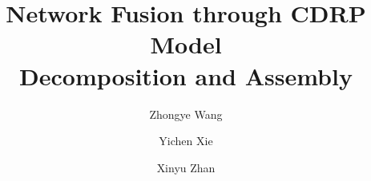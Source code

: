 \documentclass[sigplan,10pt,review]{acmart}\settopmatter{printfolios=true,printccs=false,printacmref=false}
\begin{document}
\title[Network Fusion through CDRP Model Decomposition and Assembly]{Network Fusion through CDRP Model\\ Decomposition and Assembly}         %



\author{Zhongye Wang}

\author{Yichen Xie}

\author{Xinyu Zhan}
\end{document}
